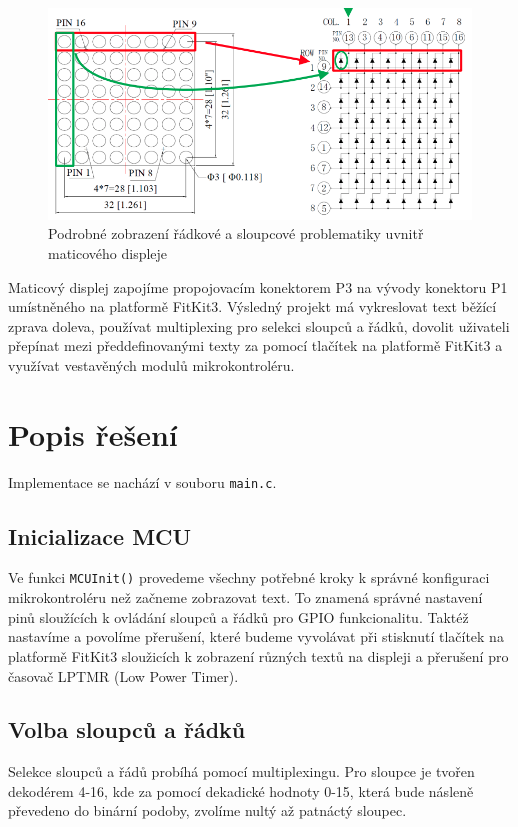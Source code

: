 \documentclass[a4paper, 11pt]{article}
\begin{document}
\begin{figure}[!htb]
    \centering
    \includegraphics[scale=0.3]{maticovy_displej.png}
    \caption{Podrobné zobrazení řádkové a sloupcové problematiky uvnitř maticového displeje}
    \label{fig:my_label}
\end{figure}

\noindent Maticový displej zapojíme propojovacím konektorem P3 na vývody konektoru P1 umístněného na platformě FitKit3. Výsledný projekt má vykreslovat text běžící zprava doleva, používat multiplexing pro selekci sloupců a řádků, dovolit uživateli přepínat mezi předdefinovanými texty za pomocí tlačítek na platformě FitKit3 a využívat vestavěných modulů mikrokontroléru.

\newpage
\section{Popis řešení}
Implementace se nachází v souboru \texttt{main.c}.

\subsection{Inicializace MCU}
Ve funkci \texttt{MCUInit()} provedeme všechny potřebné kroky k správné konfiguraci mikrokontroléru než začneme zobrazovat text. To znamená správné nastavení pinů sloužících k ovládání sloupců a řádků pro GPIO funkcionalitu. Taktéž nastavíme a povolíme přerušení, které budeme vyvolávat při stisknutí tlačítek na platformě FitKit3 sloužicích k zobrazení různých textů na displeji a přerušení pro časovač LPTMR (Low Power Timer).

\subsection{Volba sloupců a řádků}
Selekce sloupců a řádů probíhá pomocí multiplexingu. Pro sloupce je tvořen dekodérem 4-16, kde za pomocí dekadické hodnoty 0-15, která bude násleně převedeno do binární podoby, zvolíme nultý až patnáctý sloupec. 
\end{document}
